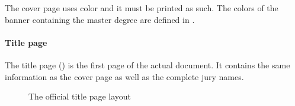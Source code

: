 \documentclass[11pt,article,oneside,a4paper]{memoir}
\begin{document}
The cover page uses color and it must be printed as such. The colors of the
banner containing the master degree are defined in .

\paragraph{Title page} The title page () is the first
page of the actual document. It contains the same information as the cover
page as well as the complete jury names.
\begin{figure}
  \centering \fboxsep=0pt
  \caption{The official title page layout}
  \label{fig:titlepage}
\end{figure}
\end{document}
